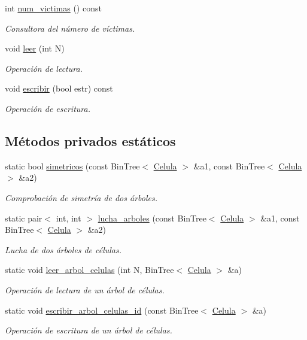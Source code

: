 \begin{DoxyCompactItemize}
int \hyperlink{class_organismo_aadcc0750f9405e7334ac6a69e4ebb1b8}{num\+\_\+victimas} () const 
\begin{DoxyCompactList}\small\item\em Consultora del número de víctimas. \end{DoxyCompactList}\item 
void \hyperlink{class_organismo_a189d611401e25f603103c420d0b62e23}{leer} (int N)
\begin{DoxyCompactList}\small\item\em Operación de lectura. \end{DoxyCompactList}\item 
void \hyperlink{class_organismo_aaa66fa8430c7413c3960472961721b8b}{escribir} (bool estr) const 
\begin{DoxyCompactList}\small\item\em Operación de escritura. \end{DoxyCompactList}\end{DoxyCompactItemize}
\subsection*{Métodos privados estáticos}
\begin{DoxyCompactItemize}
\item 
static bool \hyperlink{class_organismo_ab23431106c600e47b6666b5136b1355a}{simetricos} (const Bin\+Tree$<$ \hyperlink{class_celula}{Celula} $>$ \&a1, const Bin\+Tree$<$ \hyperlink{class_celula}{Celula} $>$ \&a2)
\begin{DoxyCompactList}\small\item\em Comprobación de simetría de dos árboles. \end{DoxyCompactList}\item 
static pair$<$ int, int $>$ \hyperlink{class_organismo_ade19332be2c0113505ec49cc03b4e9a8}{lucha\+\_\+arboles} (const Bin\+Tree$<$ \hyperlink{class_celula}{Celula} $>$ \&a1, const Bin\+Tree$<$ \hyperlink{class_celula}{Celula} $>$ \&a2)
\begin{DoxyCompactList}\small\item\em Lucha de dos árboles de células. \end{DoxyCompactList}\item 
static void \hyperlink{class_organismo_aa0ce27fb61041a40546fbd062efe84e7}{leer\+\_\+arbol\+\_\+celulas} (int N, Bin\+Tree$<$ \hyperlink{class_celula}{Celula} $>$ \&a)
\begin{DoxyCompactList}\small\item\em Operación de lectura de un árbol de células. \end{DoxyCompactList}\item 
static void \hyperlink{class_organismo_a5ab26bf4286897ed99ebda39859bbf32}{escribir\+\_\+arbol\+\_\+celulas\+\_\+id} (const Bin\+Tree$<$ \hyperlink{class_celula}{Celula} $>$ \&a)
\begin{DoxyCompactList}\small\item\em Operación de escritura de un árbol de células. \end{DoxyCompactList}\end{DoxyCompactItemize}
